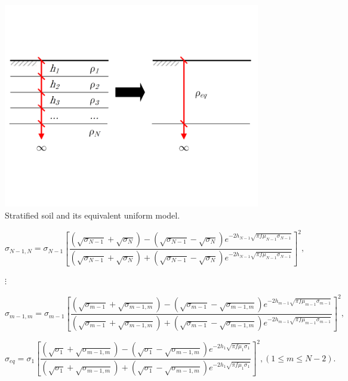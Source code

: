 \documentclass[conference]{IEEEtran}
\begin{document}
	\begin{figure}[!hbt]
		\begin{center}
			\includegraphics[width=1\columnwidth]{fig/Hummel2.pdf}
			\caption{Stratified soil and its equivalent uniform model.}
			\label{fig:Hummel}
		\end{center}
	\end{figure}
	
	
	
	\begin{figure}[ht]
		\begin{equation}\label{eq:sigma_recursive_1}
			\sigma_{N-1,N}=\sigma_{N-1} \left[\frac{(\sqrt{\sigma_{N-1}}+\sqrt{\sigma_N})-(\sqrt{\sigma_{N-1}}-\sqrt{\sigma_N})e^{-2h_{N-1}\sqrt{\pi f \mu_{N-1}\sigma_{N-1}}}}{(\sqrt{\sigma_{N-1}}+\sqrt{\sigma_N})+(\sqrt{\sigma_{N-1}}-\sqrt{\sigma_N})e^{-2h_{N-1}\sqrt{\pi f \mu_{N-1}\sigma_{N-1}}}}\right]^2, 
		\end{equation}
		\begin{center}
			$\vdots$
		\end{center}
		\begin{equation}\label{eq:sigma_recursive_2}
			\sigma_{m-1,m}=\sigma_{m-1} \left[\frac{(\sqrt{\sigma_{m-1}}+\sqrt{\sigma_{m-1,m}})-(\sqrt{\sigma_{m-1}}-\sqrt{\sigma_{m-1,m}})e^{-2h_{m-1}\sqrt{\pi f \mu_{m-1}\sigma_{m-1}}}}{(\sqrt{\sigma_{m-1}}+\sqrt{\sigma_{m-1,m}})+(\sqrt{\sigma_{m-1}}-\sqrt{\sigma_{m-1,m}})e^{-2h_{m-1}\sqrt{\pi f \mu_{m-1}\sigma_{m-1}}}}\right]^2,
		\end{equation}
		
		\begin{equation}\label{eq:sigma_recursive_3}
			\sigma_{eq}=\sigma_1 \left[\frac{(\sqrt{\sigma_1}+\sqrt{\sigma_{m-1,m}})-(\sqrt{\sigma_1}-\sqrt{\sigma_{m-1,m}})e^{-2h_1\sqrt{\pi f \mu_1\sigma_1}}}{(\sqrt{\sigma_1}+\sqrt{\sigma_{m-1,m}})+(\sqrt{\sigma_1}-\sqrt{\sigma_{m-1,m}})e^{-2h_1\sqrt{\pi f \mu_1\sigma_1}}}\right]^2, (1\leq m \leq N-2).
		\end{equation}
		
		\hrulefill
	\end{figure} 
	
\end{document}
